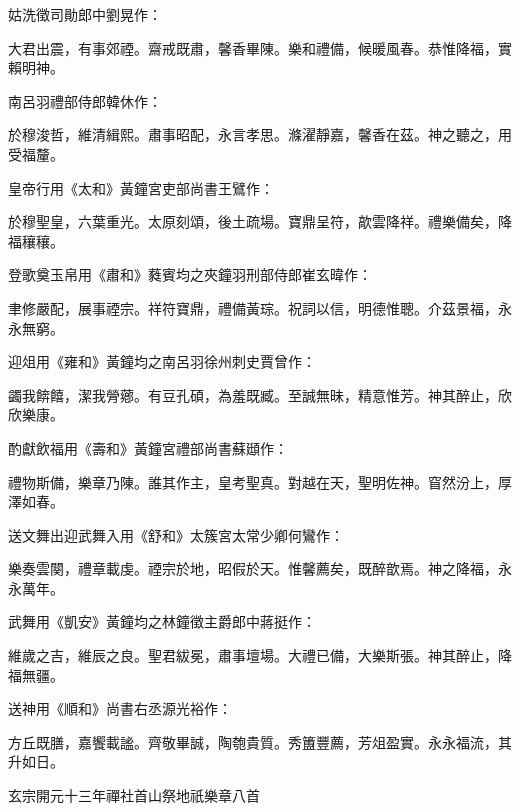 \begin{pinyinscope}
 姑洗徵司勛郎中劉晃作：



 大君出震，有事郊禋。齋戒既肅，馨香畢陳。樂和禮備，候暖風春。恭惟降福，實賴明神。



 南呂羽禮部侍郎韓休作：



 於穆浚哲，維清緝熙。肅事昭配，永言孝思。滌濯靜嘉，馨香在茲。神之聽之，用受福釐。



 皇帝行用《太和》黃鐘宮吏部尚書王鷿作：



 於穆聖皇，六葉重光。太原刻頌，後土疏場。寶鼎呈符，歊雲降祥。禮樂備矣，降福穰穰。



 登歌奠玉帛用《肅和》蕤賓均之夾鐘羽刑部侍郎崔玄暐作：



 聿修嚴配，展事禋宗。祥符寶鼎，禮備黃琮。祝詞以信，明德惟聰。介茲景福，永永無窮。



 迎俎用《雍和》黃鐘均之南呂羽徐州刺史賈曾作：



 蠲我餴饎，潔我膋薌。有豆孔碩，為羞既臧。至誠無昧，精意惟芳。神其醉止，欣欣樂康。



 酌獻飲福用《壽和》黃鐘宮禮部尚書蘇頲作：



 禮物斯備，樂章乃陳。誰其作主，皇考聖真。對越在天，聖明佐神。窅然汾上，厚澤如春。



 送文舞出迎武舞入用《舒和》太簇宮太常少卿何鸞作：



 樂奏雲闋，禮章載虔。禋宗於地，昭假於天。惟馨薦矣，既醉歆焉。神之降福，永永萬年。



 武舞用《凱安》黃鐘均之林鐘徵主爵郎中蔣挺作：



 維歲之吉，維辰之良。聖君紱冕，肅事壇場。大禮已備，大樂斯張。神其醉止，降福無疆。



 送神用《順和》尚書右丞源光裕作：



 方丘既膳，嘉饗載謐。齊敬畢誠，陶匏貴質。秀簠豐薦，芳俎盈實。永永福流，其升如日。



 玄宗開元十三年禪社首山祭地祇樂章八首




\end{pinyinscope}
